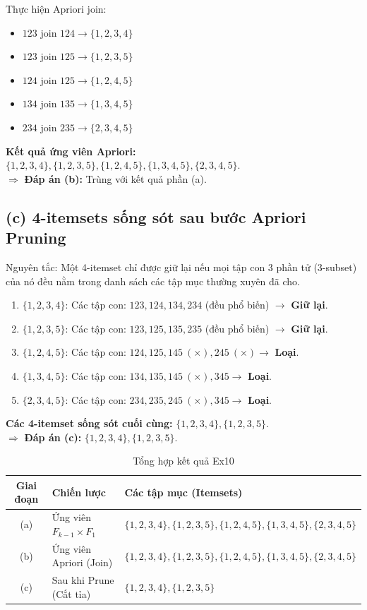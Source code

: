 Thực hiện Apriori join:
\begin{itemize}
    \item $123 \text{ join } 124 \rightarrow \{1, 2, 3, 4\}$
    \item $123 \text{ join } 125 \rightarrow \{1, 2, 3, 5\}$
    \item $124 \text{ join } 125 \rightarrow \{1, 2, 4, 5\}$
    \item $134 \text{ join } 135 \rightarrow \{1, 3, 4, 5\}$
    \item $234 \text{ join } 235 \rightarrow \{2, 3, 4, 5\}$
\end{itemize}
\textbf{Kết quả ứng viên Apriori:} $\{1, 2, 3, 4\}, \{1, 2, 3, 5\}, \{1, 2, 4, 5\}, \{1, 3, 4, 5\}, \{2, 3, 4, 5\}$. \\
$\Rightarrow$ \textbf{Đáp án (b):} Trùng với kết quả phần (a).

\subsection*{(c) 4-itemsets sống sót sau bước Apriori Pruning}
Nguyên tắc: Một 4-itemset chỉ được giữ lại nếu mọi tập con 3 phần tử (3-subset) của nó đều nằm trong danh sách các tập mục thường xuyên đã cho.
\begin{enumerate}
    \item $\{1, 2, 3, 4\}$: Các tập con: $123, 124, 134, 234$ (đều phổ biến) $\rightarrow$ \textbf{Giữ lại}.
    \item $\{1, 2, 3, 5\}$: Các tập con: $123, 125, 135, 235$ (đều phổ biến) $\rightarrow$ \textbf{Giữ lại}.
    \item $\{1, 2, 4, 5\}$: Các tập con: $124, 125, 145 \ (\times), 245 \ (\times) \rightarrow$ \textbf{Loại}.
    \item $\{1, 3, 4, 5\}$: Các tập con: $134, 135, 145 \ (\times), 345 \rightarrow$ \textbf{Loại}.
    \item $\{2, 3, 4, 5\}$: Các tập con: $234, 235, 245 \ (\times), 345 \rightarrow$ \textbf{Loại}.
\end{enumerate}
\textbf{Các 4-itemset sống sót cuối cùng:} $\{1, 2, 3, 4\}, \{1, 2, 3, 5\}$. \\
$\Rightarrow$ \textbf{Đáp án (c):} $\{1, 2, 3, 4\}, \{1, 2, 3, 5\}$.

\begin{table}[H]
    \centering
    \begin{tabular}{|c|l|l|}
        \hline
        \textbf{Giai đoạn} & \textbf{Chiến lược} & \textbf{Các tập mục (Itemsets)} \\
        \hline
        (a) & Ứng viên $F_{k-1} \times F_1$ & $\{1,2,3,4\}, \{1,2,3,5\}, \{1,2,4,5\}, \{1,3,4,5\}, \{2,3,4,5\}$ \\ \hline
        (b) & Ứng viên Apriori (Join) & $\{1,2,3,4\}, \{1,2,3,5\}, \{1,2,4,5\}, \{1,3,4,5\}, \{2,3,4,5\}$ \\ \hline
        (c) & Sau khi Prune (Cắt tỉa) & $\{1,2,3,4\}, \{1,2,3,5\}$ \\ \hline
    \end{tabular}
    \caption{Tổng hợp kết quả Ex10}
\end{table}

